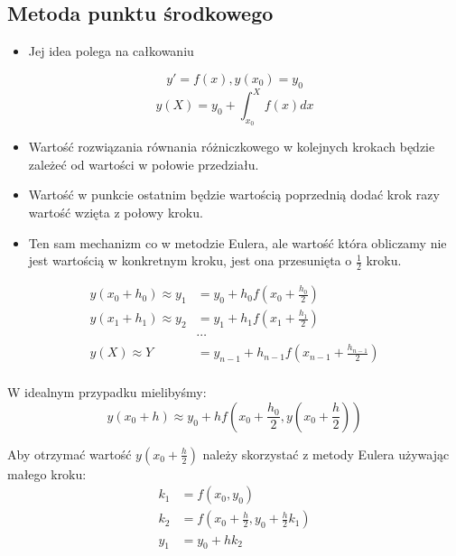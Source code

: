 \documentclass[a4paper]{article}
\begin{document}
\subsection{Metoda punktu środkowego}
\begin{itemize}
    \item Jej idea polega na całkowaniu
\end{itemize}
\begin{equation*}
    y'=f(x), y(x_0)=y_0
\end{equation*}
\begin{equation*}
    y(X) = y_0 + \int_{x_0}^{X} f(x) dx
\end{equation*}
\begin{itemize}
    \item Wartość rozwiązania równania różniczkowego w kolejnych krokach będzie zależeć od wartości w połowie przedziału.
    \item Wartość w punkcie ostatnim będzie wartością poprzednią dodać krok razy wartość wzięta z połowy kroku.
    \item Ten sam mechanizm co w metodzie Eulera, ale wartość która obliczamy nie jest wartością w konkretnym kroku, jest ona przesunięta o $\frac{1}{2}$ kroku.
\end{itemize}
\begin{equation*}
    \begin{split}
        y(x_0 + h_0) \approx y_1 & = y_0 + h_0 f(x_0 + \frac{h_0}{2} ) \\
        y(x_1 + h_1) \approx y_2 & = y_1 + h_1 f(x_1 + \frac{h_1}{2} ) \\
        & \cdots \\
        y(X) \approx Y & = y_{n-1} + h_{n-1} f(x_{n-1} + \frac{h_{n-1}}{2} ) \\
    \end{split}
\end{equation*}

W idealnym przypadku mielibyśmy:
\begin{equation*}
    y(x_0 + h) \approx y_0 + h f(x_0 + \frac{h_0}{2}, y(x_0 + \frac{h}{2}))
\end{equation*}

Aby otrzymać wartość $y(x_0 + \frac{h}{2})$ należy skorzystać z metody Eulera używając małego kroku:
\begin{equation*}
    \begin{split}
        k_1 & = f(x_0,y_0) \\
        k_2 & = f(x_0 + \frac{h}{2}, y_0 +\frac{h}{2} k_1) \\
        y_1 & = y_0 + hk_2
    \end{split}
\end{equation*}
\end{document}
